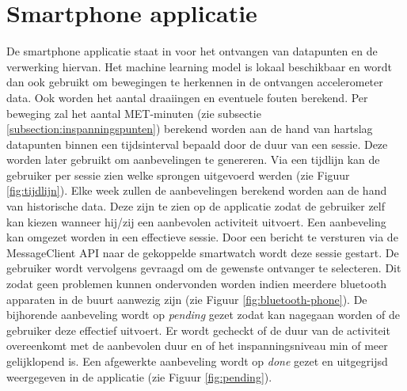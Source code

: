 \begin{figure}[!htpd]
\centering
\begin{floatrow}
\end{floatrow}
\end{figure}

\section{Smartphone applicatie}
De smartphone applicatie staat in voor het ontvangen van datapunten en de verwerking hiervan. Het machine learning model is lokaal beschikbaar en wordt dan ook gebruikt om bewegingen te herkennen in de ontvangen accelerometer data. Ook worden het aantal draaiingen en eventuele fouten berekend. Per beweging zal het aantal MET-minuten (zie subsectie \ref{subsection:inspanningspunten}) berekend worden aan de hand van hartslag datapunten binnen een tijdsinterval bepaald door de duur van een sessie. Deze worden later gebruikt om aanbevelingen te genereren. 
Via een tijdlijn kan de gebruiker per sessie zien welke sprongen uitgevoerd werden (zie Figuur \ref{fig:tijdlijn}).
Elke week zullen de aanbevelingen berekend worden aan de hand van historische data. Deze zijn te zien op de applicatie zodat de gebruiker zelf kan kiezen wanneer hij/zij een aanbevolen activiteit uitvoert. Een aanbeveling kan omgezet worden in een effectieve sessie. Door een bericht te versturen via de MessageClient API naar de gekoppelde smartwatch wordt deze sessie gestart. De gebruiker wordt vervolgens gevraagd om de gewenste ontvanger te selecteren. Dit zodat geen problemen kunnen ondervonden worden indien meerdere bluetooth apparaten in de buurt aanwezig zijn (zie Figuur \ref{fig:bluetooth-phone}). De bijhorende aanbeveling wordt op \textit{pending} gezet zodat kan nagegaan worden of de gebruiker deze effectief uitvoert. Er wordt gecheckt of de duur van de activiteit overeenkomt met de aanbevolen duur en of het inspanningsniveau min of meer gelijklopend is.
Een afgewerkte aanbeveling wordt op \textit{done} gezet en uitgegrijsd weergegeven in de applicatie (zie Figuur \ref{fig:pending}).

\begin{figure}[!htpd]
\centering
\begin{floatrow}
\end{floatrow}
\end{figure}


